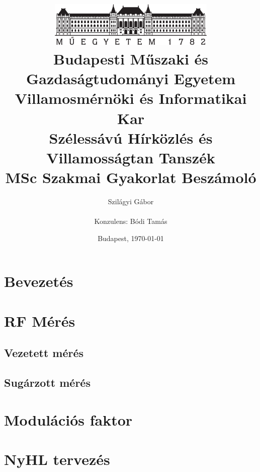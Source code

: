 \documentclass[a4paper,12pt,titlepage]{article}
\title{
\includegraphics[width=0.6\textwidth]{kep/bme_logo.pdf} \\
\centering
\large{\textbf{Budapesti Műszaki és Gazdaságtudományi Egyetem}\\
\textbf{Villamosmérnöki és Informatikai Kar}\\
\textbf{Szélessávú Hírközlés és Villamosságtan Tanszék}}\\
\vspace{6cm}
\huge{\textbf{MSc Szakmai Gyakorlat Beszámoló}} \\
\vspace{2cm}}
\author{Szilágyi Gábor \\\vspace{2cm}\\ Konzulens: Bódi Tamás}
\date{Budapest, \today}
\begin{document}
  	\maketitle
	\section{Bevezetés}
	\section{RF Mérés}
		\subsection{Vezetett mérés}
		\subsection{Sugárzott mérés}
	\section{Modulációs faktor}
	\section{NyHL tervezés}
\end{document}
